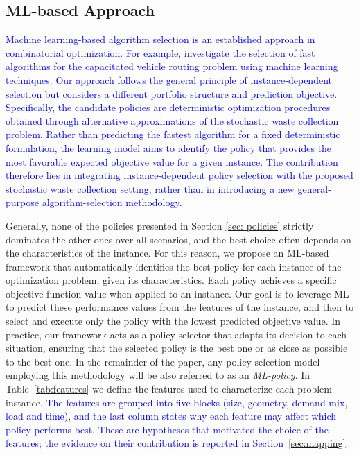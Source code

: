 \documentclass[authoryear,preprint,12pt]{elsarticle}
\newcommand{\rev}[1]{\textcolor{blue}{{#1}}}
\begin{document}
\subsection{ML-based Approach}


\rev{Machine learning-based algorithm selection is an established approach in combinatorial optimization. For example, \cite{Asin2024} investigate the selection of fast algorithms for the capacitated vehicle routing problem using machine learning techniques. Our approach follows the general principle of instance-dependent selection but considers a different portfolio structure and prediction objective. Specifically, the candidate policies are deterministic optimization procedures obtained through alternative approximations of the stochastic waste collection problem. Rather than predicting the fastest algorithm for a fixed deterministic formulation, the learning model aims to identify the policy that provides the most favorable expected objective value for a given instance. The contribution therefore lies in integrating instance-dependent policy selection with the proposed stochastic waste collection setting, rather than in introducing a new general-purpose algorithm-selection methodology.}



Generally, none of the policies presented in Section \ref{sec: policies} strictly dominates the other ones over all scenarios, and the best choice often depends on the characteristics of the instance. For this reason, we propose an ML-based framework that automatically identifies the best policy for each instance of the optimization problem, given its characteristics. Each policy achieves a specific objective function value when applied to an instance. Our goal is to leverage ML to predict these performance values from the features of the instance, and then to select and execute only the policy with the lowest predicted objective value. In practice, our framework acts as a policy-selector that adapts its decision to each situation, ensuring that the selected policy is the best one or as close as possible to the best one. In the remainder of the paper, any policy selection model employing this methodology will be also referred to as an \textit{ML-policy}.
In Table~\ref{tab:features} we define the features used to characterize each problem instance. \rev{The features are grouped into five blocks (size, geometry, demand mix, load and time), and the last column states why each feature may affect which policy performs best. These are hypotheses that motivated the choice of the features; the evidence on their contribution is reported in Section~\ref{sec:mapping}.}
\end{document}
